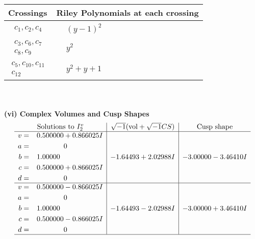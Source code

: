\documentclass[1p]{elsarticle_modified}
\theoremstyle{definition}
\newcommand{\I}{\sqrt{-1}}
\begin{document}
\begin{tabular}{m{50pt}|m{274pt}}
Crossings & \hspace{64pt}Riley Polynomials at each crossing \\
\hline $$\begin{aligned}c_{1},c_{2},c_{4}\end{aligned}$$&$\begin{aligned}
&(y-1)^2
\end{aligned}$\\
\hline $$\begin{aligned}c_{3},c_{6},c_{7}\\c_{8},c_{9}\end{aligned}$$&$\begin{aligned}
&y^2
\end{aligned}$\\
\hline $$\begin{aligned}c_{5},c_{10},c_{11}\\c_{12}\end{aligned}$$&$\begin{aligned}
&y^2+y+1
\end{aligned}$\\
\hline
\end{tabular}\\~\\
\newpage\flushleft \textbf{(vi) Complex Volumes and Cusp Shapes}
$$\begin{array}{c|c|c}  
\text{Solutions to }I^v_{2}& \I (\text{vol} + \sqrt{-1}CS) & \text{Cusp shape}\\
 \hline 
\begin{aligned}
v &= \phantom{-}0.500000 + 0.866025 I \\
a &= \phantom{-0.000000 } 0 \\
b &= \phantom{-}1.00000\phantom{ +0.000000I} \\
c &= \phantom{-}0.500000 + 0.866025 I \\
d &= \phantom{-0.000000 } 0\end{aligned}
 & -1.64493 + 2.02988 I & -3.00000 - 3.46410 I \\ \hline\begin{aligned}
v &= \phantom{-}0.500000 - 0.866025 I \\
a &= \phantom{-0.000000 } 0 \\
b &= \phantom{-}1.00000\phantom{ +0.000000I} \\
c &= \phantom{-}0.500000 - 0.866025 I \\
d &= \phantom{-0.000000 } 0\end{aligned}
 & -1.64493 - 2.02988 I & -3.00000 + 3.46410 I\\
 \hline 
 \end{array}$$\newpage\newpage\renewcommand{\arraystretch}{1}
\end{document}
